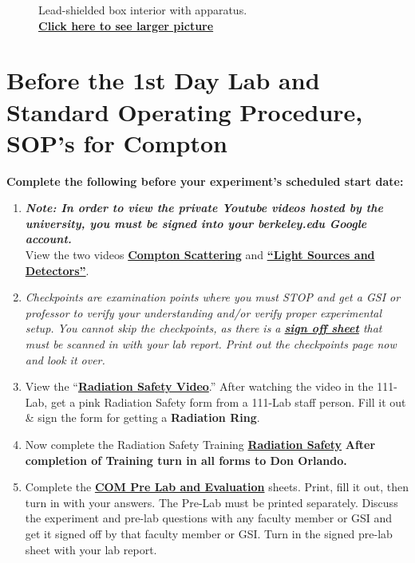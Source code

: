 \documentclass{../lab}
\begin{document}
\begin{figure}[H]
\begin{minipage}{.49\linewidth}
    \caption{Lead-shielded box interior with apparatus. \\ \href{http://experimentationlab.berkeley.edu/sites/default/files/images/COM_Inside_3525-Lg.JPG}{\textbf{Click here to see larger picture}}}
\end{minipage} 
\end{figure}

\section{Before the 1st Day Lab and Standard Operating Procedure, SOP's for Compton}
\label{sec:BeforeTheLab}

\textbf{Complete the following before your experiment's scheduled start date:}

\begin{enumerate}
    \item \emph{\textbf{Note: In order to view the private Youtube videos hosted by the university, you must be signed into your berkeley.edu Google account.}} \\
    View the two videos \href{http://youtu.be/PVgqyf3kNRs}{\textbf{Compton Scattering}} and \href{http://youtu.be/lQKLakISoBA}{\textbf{``Light Sources and Detectors''}}.

    \item \emph{Checkpoints are examination points where you must STOP and get a GSI or professor to verify your understanding and/or verify proper experimental setup. You cannot skip the checkpoints, as there is a \href{http://experimentationlab.berkeley.edu/node/132}{\textbf{sign off sheet}} that must be scanned in with your lab report. Print out the checkpoints page now and look it over.}

    \item View the     ``\href{http://youtu.be/KHxtzF5pZZM}{\textbf{Radiation Safety Video}}.'' After watching the video in the 111-Lab, get a pink Radiation Safety form from a 111-Lab staff person. Fill it out \& sign the form for getting a \textbf{Radiation Ring}.

    \item Now complete the Radiation Safety Training \href{http://experimentationlab.berkeley.edu/RadiationSafety}{\textbf{Radiation Safety}} \textbf{After completion of Training turn in all forms to Don Orlando.}

    \item Complete the \href{http://experimentationlab.berkeley.edu/COMPreLab}{\textbf{COM Pre Lab and Evaluation}} sheets. Print, fill it out, then turn in with your answers. The Pre-Lab must be printed separately. Discuss the experiment and pre-lab questions with any faculty member or GSI and get it signed off by that faculty member or GSI. Turn in the signed pre-lab sheet with your lab report.


\end{enumerate}
\end{document}
